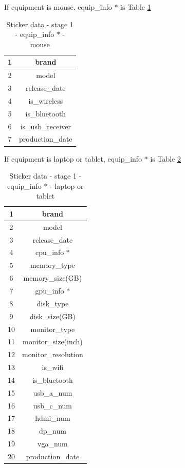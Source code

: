 \documentclass[a4paper,11pt]{article}
\begin{document}
If equipment is mouse, equip\_info $*$ is Table \ref{table:sticker_data_stage_1_equip_info_mouse}
\begin{table}[h!]
	\begin{center}
		\begin{tabular}{ | c | c | }
			\hline
			1 & brand \\ 
			\hline
			2 & model  \\  
			\hline
			3 & release\_date \\
			\hline
			4 & is\_wireless \\ 
			\hline
			5 &  is\_bluetooth \\  
			\hline
			6 & is\_usb\_receiver \\
			\hline
			7 & production\_date \\
			\hline
		\end{tabular}
		\caption{Sticker data \-- stage 1 \-- equip\_info $*$ \-- mouse}
		\label{table:sticker_data_stage_1_equip_info_mouse}
	\end{center}
\end{table}

If equipment is laptop or tablet, equip\_info $*$ is Table \ref{table:sticker_data_stage_1_equip_info_laptop}
\begin{table}[h!]
	\begin{center}
		\begin{tabular}{ | c | c | }
			\hline
			1 & brand \\ 
			\hline
			2 & model  \\  
			\hline
			3 & release\_date \\
			\hline
			4 & cpu\_info $*$ \\ 
			\hline
			5 &  memory­\_type \\  
			\hline
			6 & memory\_size(GB) \\
			\hline
			7 & gpu­\_info $*$ \\  
			\hline
			8 & disk\_type \\
			\hline
			9 & disk\_size(GB) \\
			\hline
			10 & monitor­\_type \\  
			\hline
			11 & monitor\_size(inch) \\ 
			\hline
			12 & monitor\_resolution  \\  
			\hline
			13 & is\_wifi \\
			\hline
			14 & is\_bluetooth \\ 
			\hline
			15 & usb\_a\_num \\  
			\hline
			16 & usb\_c\_num \\
			\hline
			17 & hdmi\_num \\
			\hline
			18 & dp\_num \\  
			\hline
			19 & vga\_num \\  
			\hline
			20 & production\_date \\
			\hline
		\end{tabular}
		\caption{Sticker data \-- stage 1 \-- equip\_info $*$ \-- laptop or tablet}
		\label{table:sticker_data_stage_1_equip_info_laptop}
	\end{center}
\end{table}
\end{document}
